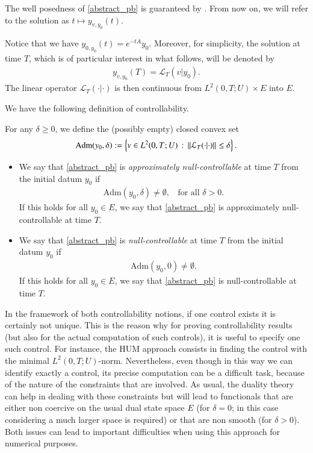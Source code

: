 The well posedness of \eqref{abstract_pb} is guaranteed by \cite[Theorem 2.37]{coron2007control}. From now on, we will refer to the solution as $t\mapsto y_{v,y_0}(t)$.

Notice that we have $y_{0,y_0}(t)= e^{-tA}y_0$. Moreover, for simplicity, the solution at time $T$, which is of particular interest in what follows, will be denoted by 
\begin{align*}
	y_{v,y_0}(T)=\mathcal{L}_T(v|y_0).
\end{align*} 
The linear operator $\mathcal{L}_T(\cdot|\cdot)$ is then continuous from $L^2(0,T;U)\times E$ into $E$.

We have the following definition of controllability.

\begin{definition}
For any $\delta\geq 0$, we define the (possibly empty) closed convex set 
\begin{align*}
	\textrm{Adm}(y_0,\delta):=\left\{v\in L^2(0,T;U)\,:\, {\left\|\mathcal{L}_T(\cdot|\cdot)\right\|}_{}\leq\delta\right\}.
\end{align*}
\begin{itemize}
	\item We say that \eqref{abstract_pb} is \textit{approximately null-controllable} at time $T$ from the initial datum $y_0$ if 
	\begin{align*}
		\textrm{Adm}(y_0,\delta)\neq\emptyset,\;\;\textrm{ for all } \delta>0.
	\end{align*}  
	If this holds for all $y_0\in E$, we say that \eqref{abstract_pb} is approximately null-controllable at time $T$. 
	
	\item We say that \eqref{abstract_pb} is \textit{null-controllable} at time $T$ from the initial datum $y_0$ if 
	\begin{align*}
		\textrm{Adm}(y_0,0)\neq\emptyset.
	\end{align*}	
	If this holds for all $y_0\in E$, we say that \eqref{abstract_pb} is null-controllable at time $T$.
\end{itemize} 
\end{definition}

In the framework of both controllability notions, if one control exists it is certainly not unique. This is the reason why for proving controllability results (but also for the actual computation of such controls), it is useful to specify one such control. For instance, the HUM approach consists in finding the control with the minimal $L^2(0,T;U)$-norm. Nevertheless, even though in this way we can identify exactly a control, its precise computation can be a difficult task, because of the nature of the constraints that are involved. As usual, the duality theory can help in dealing with these constraints but will lead to functionals that are either non coercive on the usual dual state space $E$ (for $\delta = 0$; in this
case considering a much larger space is required) or that are non smooth (for $\delta > 0$). Both issues can lead to important difficulties when using this approach for numerical purposes.

